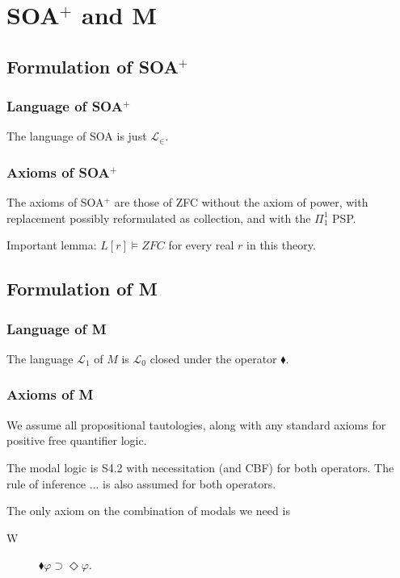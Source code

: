 \documentclass{article}
\newcommand\D{\blacklozenge}
\begin{document}
\section{SOA$^+$ and M}
\subsection{Formulation of SOA$^+$}
\subsubsection{Language of SOA$^+$}
The language of SOA is just $\mathcal{L}_\in$.
\subsubsection{Axioms of SOA$^+$}
The axioms of SOA$^+$ are those of ZFC without the axiom 
of power, with replacement possibly reformulated as 
collection, and with the $\Pi_1^1$ PSP.

Important lemma: $L[r] \vDash ZFC$ for every real $r$ in this theory.
\subsection{Formulation of M}
\subsubsection{Language of M}
The language $\mathcal{L}_1$ of $M$ is $\mathcal{L}_0$ closed
under the operator $\blacklozenge$.
\subsubsection{Axioms of M}
We assume all propositional tautologies, 
along with any standard axioms for positive free quantifier logic.

The modal logic is S4.2 with necessitation (and CBF) for both operators. 
The rule of inference ... is also assumed for both operators.

The only axiom on the combination of modals we need is 
\begin{description}
    \item[W] $\D \varphi \supset \Diamond \varphi$. 
\end{description}
\end{document}
